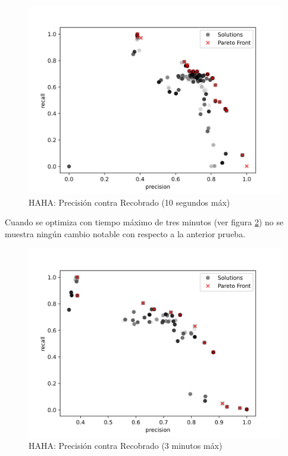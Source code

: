 \begin{figure}[ht]
    \centering
    \includegraphics[scale=0.65]{Pictures/haha_precision_vs_recall.jpg}
    \caption{HAHA: Precisi\'on contra Recobrado (10 segundos m\'ax)}
    \label{impl:fig:haha:precision_vs_recall}
\end{figure}

Cuando se optimiza con tiempo m\'aximo de tres minutos (ver figura \ref{impl:fig:haha:precision_vs_recall_3min}) no se muestra ning\'un cambio notable con respecto a la anterior prueba. 

\begin{figure}[ht]
    \centering
    \includegraphics[scale=0.65]{Pictures/haha_precision_vs_recall_3min.jpg}
    \caption{HAHA: Precisi\'on contra Recobrado (3 minutos m\'ax)}
    \label{impl:fig:haha:precision_vs_recall_3min}
\end{figure}

